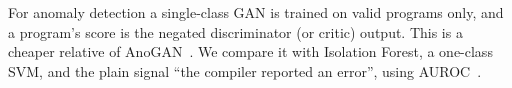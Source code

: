 For anomaly detection a single-class GAN is trained on valid programs only, and a program's score is the negated
discriminator (or critic) output. This is a cheaper relative of AnoGAN~\cite{schlegl2017}. We compare it with Isolation
Forest, a one-class SVM, and the plain signal ``the compiler reported an error'', using AUROC~\cite{fawcett2006}.
